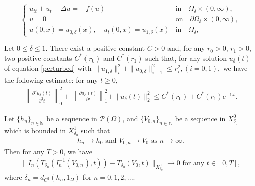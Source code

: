 \documentclass[10pt,a4paper]{amsart}
\begin{document}
\begin{equation} \label{perturbed}
\begin{cases}
u_{tt} + u_t - \Delta u = -f(u)  ~& \mbox{in}\quad \Omega_\delta \times (0,\infty), \\
u=0 &\mbox{on} \quad \partial \Omega_\delta \times (0, \infty), \\
u(0,x) = u_{0,\delta}(x), \quad u_t(0,x)=u_{1,\delta}(x) & \mbox{in}  \quad \Omega_\delta, 
\end{cases}
\end{equation}

\begin{lemma}\label{theo21}
    Let $0\leq \delta\leq 1$. There exist a positive constant $C>0$ and, for any $r_0>0$, $r_1>0$, two positive constants $C^*(r_0)$ and $C^*(r_1)$ such that, for any solution $u_\delta(t)$ of equation \eqref{perturbed} with $\|u_{1,\delta}\|^2_i + \|u_{0,\delta}\|^2_{i+1} \leq r_i ^2, (i=0,1),$ we have the following estimate: for any $t\geq 0$,
    \begin{align*}
        \left\|\frac{\partial^2 u_\delta (t)}{\partial^2 t}\right\|^2_0 +\left\|\frac{\partial u_\delta (t)}{\partial t}\right\|^2_1 + \|u_\delta(t)\|^2_2 \leq C^*(r_0)+ C^*(r_1)e^{-C t}.
    \end{align*}
\end{lemma}

\begin{lemma}\label{lem in}
    Let $\{h_n\}_{n\in \mathbb{N}}$ be a sequence in $\mathcal P(\Omega)$, and $\{V_{0,n}\}_{n\in \mathbb{N}}$ be a sequence in $X^0_{\delta_0}$  which is bounded in $X^1_{\delta_0}$ such that
    \begin{align*}
        h_n \rightarrow h_0 \mbox{ and } V_{0,n}\rightarrow V_0 \mbox{ as } n\rightarrow \infty.
    \end{align*}
    Then for any $T>0$, we have
    \begin{align*}
        \|I_n(T_{\delta_n}(I_n^{-1}(V_{0,n}),t))-T_{\delta_0}(V_0, t)\|_{X^0_{\delta_0}}\rightarrow 0 \mbox{ for any } t\in [0, T],
    \end{align*}
    where $\delta_n = d_{C^2}(h_n, 1_\Omega)$ for $n = 0,1,2,...$. 
\end{lemma}
\end{document}
